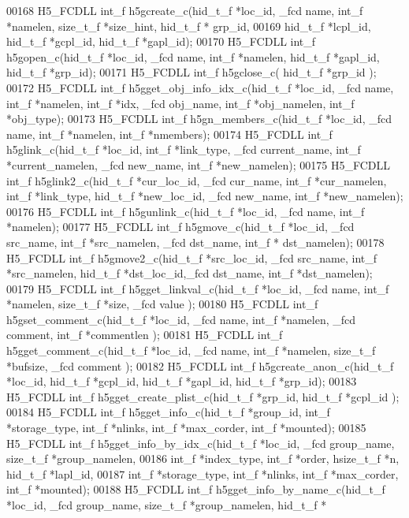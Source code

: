 \begin{DoxyCode}
00168 H5\_FCDLL int\_f h5gcreate\_c(hid\_t\_f *loc\_id, \_fcd name, int\_f *namelen, size\_t\_f *size\_hint,  hid\_t\_f *
      grp\_id,
00169                  hid\_t\_f *lcpl\_id, hid\_t\_f *gcpl\_id, hid\_t\_f *gapl\_id);
00170 H5\_FCDLL int\_f h5gopen\_c(hid\_t\_f *loc\_id, \_fcd name, int\_f *namelen, hid\_t\_f *gapl\_id, hid\_t\_f *grp\_id);
00171 H5\_FCDLL int\_f h5gclose\_c( hid\_t\_f *grp\_id );
00172 H5\_FCDLL int\_f h5gget\_obj\_info\_idx\_c(hid\_t\_f *loc\_id, \_fcd name, int\_f *namelen, int\_f *idx, \_fcd obj\_name,
       int\_f *obj\_namelen, int\_f *obj\_type);
00173 H5\_FCDLL int\_f h5gn\_members\_c(hid\_t\_f *loc\_id, \_fcd name, int\_f *namelen, int\_f *nmembers);
00174 H5\_FCDLL int\_f h5glink\_c(hid\_t\_f *loc\_id, int\_f *link\_type, \_fcd current\_name, int\_f *current\_namelen, \_fcd
       new\_name, int\_f *new\_namelen);
00175 H5\_FCDLL int\_f h5glink2\_c(hid\_t\_f *cur\_loc\_id, \_fcd cur\_name, int\_f *cur\_namelen, int\_f *link\_type, hid\_t\_f
       *new\_loc\_id, \_fcd new\_name, int\_f *new\_namelen);
00176 H5\_FCDLL int\_f h5gunlink\_c(hid\_t\_f *loc\_id, \_fcd name, int\_f *namelen);
00177 H5\_FCDLL int\_f h5gmove\_c(hid\_t\_f *loc\_id, \_fcd src\_name, int\_f *src\_namelen, \_fcd dst\_name, int\_f *
      dst\_namelen);
00178 H5\_FCDLL int\_f h5gmove2\_c(hid\_t\_f *src\_loc\_id, \_fcd src\_name, int\_f *src\_namelen, hid\_t\_f *dst\_loc\_id,\_fcd 
      dst\_name, int\_f *dst\_namelen);
00179 H5\_FCDLL int\_f h5gget\_linkval\_c(hid\_t\_f *loc\_id, \_fcd name, int\_f *namelen, size\_t\_f *size, \_fcd value );
00180 H5\_FCDLL int\_f h5gset\_comment\_c(hid\_t\_f *loc\_id, \_fcd name, int\_f *namelen, \_fcd comment, int\_f *commentlen
      );
00181 H5\_FCDLL int\_f h5gget\_comment\_c(hid\_t\_f *loc\_id, \_fcd name, int\_f *namelen, size\_t\_f *bufsize, \_fcd comment
      );
00182 H5\_FCDLL int\_f h5gcreate\_anon\_c(hid\_t\_f *loc\_id, hid\_t\_f *gcpl\_id, hid\_t\_f *gapl\_id, hid\_t\_f *grp\_id);
00183 H5\_FCDLL int\_f h5gget\_create\_plist\_c(hid\_t\_f *grp\_id, hid\_t\_f *gcpl\_id );
00184 H5\_FCDLL int\_f h5gget\_info\_c(hid\_t\_f *group\_id, int\_f *storage\_type, int\_f *nlinks, int\_f *max\_corder, 
      int\_f *mounted);
00185 H5\_FCDLL int\_f h5gget\_info\_by\_idx\_c(hid\_t\_f *loc\_id, \_fcd group\_name, size\_t\_f *group\_namelen,
00186                      int\_f *index\_type, int\_f *order, hsize\_t\_f *n, hid\_t\_f *lapl\_id,
00187                      int\_f *storage\_type, int\_f *nlinks, int\_f *max\_corder, int\_f *mounted);
00188 H5\_FCDLL int\_f h5gget\_info\_by\_name\_c(hid\_t\_f *loc\_id, \_fcd group\_name, size\_t\_f *group\_namelen, hid\_t\_f *

\end{DoxyCode}
